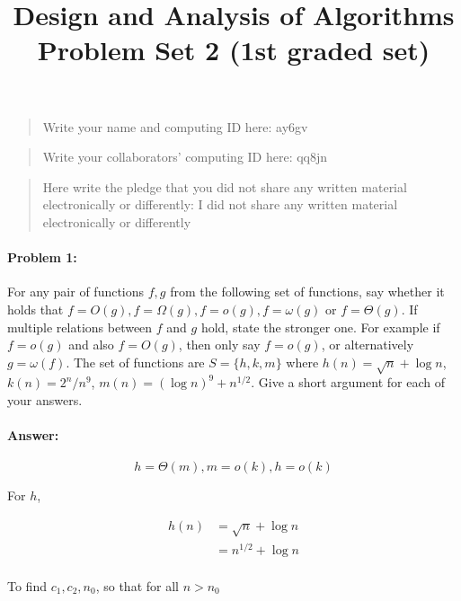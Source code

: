 \documentclass{article}
\title{Design and Analysis of Algorithms\\ {\bf Problem Set 2 (1st graded set)}}
\author{}
\begin{document}
\maketitle

\begin{quote}
    Write your name and computing ID here: ay6gv
\end{quote}

\vspace{20px}

\begin{quote}
    Write your collaborators' computing ID here: qq8jn
\end{quote}

\vspace{20px}

\begin{quote}
    Here write the pledge that you did not share any written material electronically or differently: I did not share any written material electronically or differently
\end{quote}

\newpage
\paragraph{Problem 1:} For any pair of functions $f,g$ from the following set of functions, say whether it holds that $f=O(g), f=\Omega(g), f=o(g), f=\omega(g) $ or $f=\Theta(g)$. If multiple relations between $f$ and $g$ hold, state the stronger one. For example if $f=o(g)$ and also $f=O(g)$, then only say $f=o(g)$, or alternatively $g=\omega(f)$.  The set of functions are $S= \{h,k,m\}$ where $h(n)=\sqrt{n}+\log n$, $k(n) = 2^n/n^9$, $m(n) = (\log n)^9 + n^{1/2}$. Give a short argument for each of your answers.


\paragraph{Answer:}

$$h = \Theta(m), m = o(k), h = o(k)$$

For $h$,

$$\begin{aligned}
h(n)&=\sqrt{n}+\log n\\
&=n^{1/2}+\log n\\
\end{aligned}$$

To find $c_1, c_2, n_0$, so that for all $n>n_0$
\end{document}
